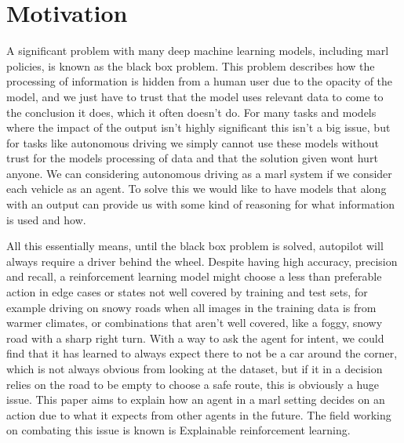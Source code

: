 \documentclass[UKenglish]{uiomasterthesis}
\begin{document}
\section{Motivation}
\label{sec:motivation}
A significant problem with many deep machine learning models, including \ac{marl} policies, is known as the black box problem\cite{zednik2019solving}. This problem describes how the processing of information is hidden from a human user due to the opacity of the model, and we just have to trust that the model uses relevant data to come to the conclusion it does, which it often doesn't do. For many tasks and models where the impact of the output isn't highly significant this isn't a big issue, but for tasks like autonomous driving we simply cannot use these models without trust for the models processing of data and that the solution given wont hurt anyone. We can considering autonomous driving as a \ac{marl} system if we consider each vehicle as an agent. To solve this we would like to have models that along with an output can provide us with some kind of reasoning for what information is used and how.

All this essentially means, until the black box problem is solved, autopilot will always require a driver behind the wheel\cite{tian2018deeptest}. Despite having high accuracy, precision and recall, a reinforcement learning model might choose a less than preferable action in edge cases or states not well covered by training and test sets, for example driving on snowy roads when all images in the training data is from warmer climates, or combinations that aren't well covered, like a foggy, snowy road with a sharp right turn.
With a way to ask the agent for intent, we could find that it has learned to always expect there to not be a car around the corner, which is not always obvious from looking at the dataset, but if it in a decision relies on the road to be empty to choose a safe route, this is obviously a huge issue. This paper aims to explain how an agent in a \ac{marl} setting decides on an action due to what it expects from other agents in the future. The field working on combating this issue is known is Explainable reinforcement learning.
\end{document}
